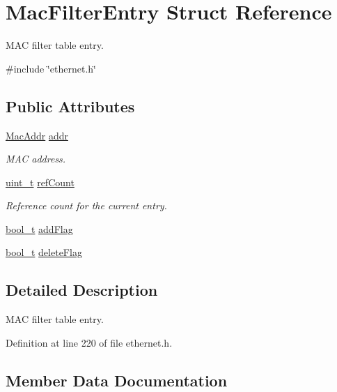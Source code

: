 \hypertarget{structMacFilterEntry}{}\section{Mac\+Filter\+Entry Struct Reference}
\label{structMacFilterEntry}


M\+AC filter table entry.  




{\ttfamily \#include \char`\"{}ethernet.\+h\char`\"{}}

\subsection*{Public Attributes}
\begin{DoxyCompactItemize}
\item 
\hyperlink{ethernet_8h_a1e00ed3977e8a770e8b4ae4cb306d1c0}{Mac\+Addr} \hyperlink{structMacFilterEntry_a30caa211d6cc1bb2416165526a2ab6cb}{addr}
\begin{DoxyCompactList}\small\item\em M\+AC address. \end{DoxyCompactList}\item 
\hyperlink{compiler__port_8h_a12a1e9b3ce141648783a82445d02b58d}{uint\+\_\+t} \hyperlink{structMacFilterEntry_a4a1195d4086f58ef57862fa43551e73a}{ref\+Count}
\begin{DoxyCompactList}\small\item\em Reference count for the current entry. \end{DoxyCompactList}\item 
\hyperlink{compiler__port_8h_a812d16e5494522586b3784e55d479912}{bool\+\_\+t} \hyperlink{structMacFilterEntry_a3594f70670b96bcab217db87696ff585}{add\+Flag}
\item 
\hyperlink{compiler__port_8h_a812d16e5494522586b3784e55d479912}{bool\+\_\+t} \hyperlink{structMacFilterEntry_a4fd4a00a88556b70cb2582762cdb8b19}{delete\+Flag}
\end{DoxyCompactItemize}


\subsection{Detailed Description}
M\+AC filter table entry. 

Definition at line 220 of file ethernet.\+h.



\subsection{Member Data Documentation}
\mbox{\label{structMacFilterEntry_a3594f70670b96bcab217db87696ff585}} 
